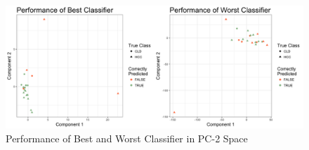 \documentclass[a4paper]{article}
\begin{document}
\begin{figure}[h!]
\centering
\includegraphics[scale=0.4]{Fig05.png}
\caption{Performance of Best and Worst Classifier in PC-2 Space}
\label{fig:05}
\end{figure}



	
\newpage



\end{document}

